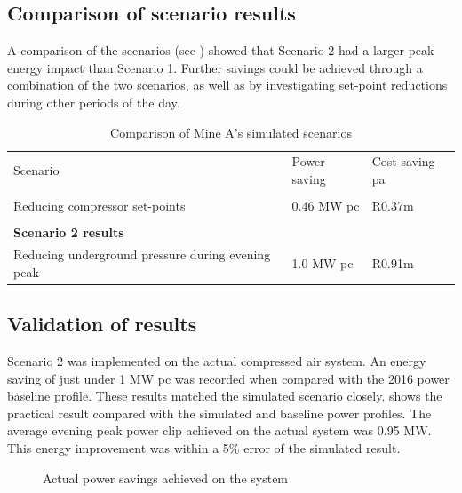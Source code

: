 \subsection{Comparison of scenario results}
A comparison of the scenarios (see ) showed that Scenario 2 had a larger peak energy impact than Scenario 1. Further savings could be achieved through a combination of the two scenarios, as well as by investigating  set-point reductions during other periods of the day.\\
\begin{table}[h!]
	\caption{Comparison of Mine A's simulated scenarios}
	\centering
	\begin{tabular}{p{}
			p{}
			p{}}
		\hline 
		Scenario & Power saving & Cost saving \gls{pa} \\
		\hhline{===} 
		\multicolumn{3}{l}{\textbf{Scenario 1 results}} \\
		Reducing compressor  set-points & $ 0.46 $ MW \gls{pc} & R0.37m \\
		\\
		\multicolumn{3}{l}{\textbf{Scenario 2 results}} \\
		Reducing underground pressure during evening peak& 1.0 MW \gls{pc} & R0.91m\\
		\hline
	\end{tabular}
	
	\label{Table: A Comparison}
\end{table}

\subsection{Validation of results}
Scenario 2 was implemented on the actual compressed air system. An energy saving of just under 1 MW \gls{pc} was recorded when compared with the 2016 power baseline profile. These results matched the simulated scenario closely.  shows the practical result compared with the simulated and baseline power profiles. The average evening peak power clip achieved on the actual system was 0.95 MW. This energy improvement was within a 5\% error of the simulated result.
\begin{figure}[h!]
	\centering
	
	\caption{Actual power savings achieved on the system}
	\label{fig: Actual permormance beet}
\end{figure}
